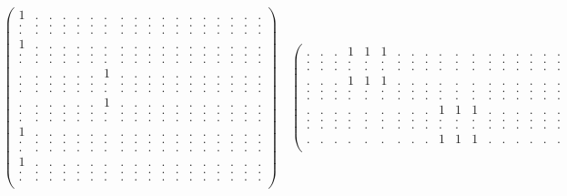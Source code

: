 \documentclass[12pt,a4paper]{amsart}
\begin{document}
\newpage

\begin{align*}
\left(\begin{array}{rrr|rrr|rrr|rrr|rrr|rrr}%
1&.&.&.&.&.&.&.&.&.&.&.&.&.&.&.&.&.\\%
.&.&.&.&.&.&.&.&.&.&.&.&.&.&.&.&.&.\\%
.&.&.&.&.&.&.&.&.&.&.&.&.&.&.&.&.&.\\ \hline
1&.&.&.&.&.&.&.&.&.&.&.&.&.&.&.&.&.\\%
.&.&.&.&.&.&.&.&.&.&.&.&.&.&.&.&.&.\\%
.&.&.&.&.&.&.&.&.&.&.&.&.&.&.&.&.&.\\ \hline
.&.&.&.&.&.&1&.&.&.&.&.&.&.&.&.&.&.\\%
.&.&.&.&.&.&.&.&.&.&.&.&.&.&.&.&.&.\\%
.&.&.&.&.&.&.&.&.&.&.&.&.&.&.&.&.&.\\ \hline
.&.&.&.&.&.&1&.&.&.&.&.&.&.&.&.&.&.\\%
.&.&.&.&.&.&.&.&.&.&.&.&.&.&.&.&.&.\\%
.&.&.&.&.&.&.&.&.&.&.&.&.&.&.&.&.&.\\ \hline
1&.&.&.&.&.&.&.&.&.&.&.&.&.&.&.&.&.\\%
.&.&.&.&.&.&.&.&.&.&.&.&.&.&.&.&.&.\\%
.&.&.&.&.&.&.&.&.&.&.&.&.&.&.&.&.&.\\ \hline
1&.&.&.&.&.&.&.&.&.&.&.&.&.&.&.&.&.\\%
.&.&.&.&.&.&.&.&.&.&.&.&.&.&.&.&.&.\\%
.&.&.&.&.&.&.&.&.&.&.&.&.&.&.&.&.&.\\%
\end{array}\right)%
\quad
\left(\begin{array}{rrr|rrr|rrr|rrr|rrr|rrr}%
.&.&.&1&1&1&.&.&.&.&.&.&.&.&.&.&.&.\\%
.&.&.&.&.&.&.&.&.&.&.&.&.&.&.&.&.&.\\%
.&.&.&.&.&.&.&.&.&.&.&.&.&.&.&.&.&.\\ \hline
.&.&.&1&1&1&.&.&.&.&.&.&.&.&.&.&.&.\\%
.&.&.&.&.&.&.&.&.&.&.&.&.&.&.&.&.&.\\%
.&.&.&.&.&.&.&.&.&.&.&.&.&.&.&.&.&.\\ \hline
.&.&.&.&.&.&.&.&.&1&1&1&.&.&.&.&.&.\\%
.&.&.&.&.&.&.&.&.&.&.&.&.&.&.&.&.&.\\%
.&.&.&.&.&.&.&.&.&.&.&.&.&.&.&.&.&.\\ \hline
.&.&.&.&.&.&.&.&.&1&1&1&.&.&.&.&.&.\\%

\end{array}
\end{align*}
\end{document}
